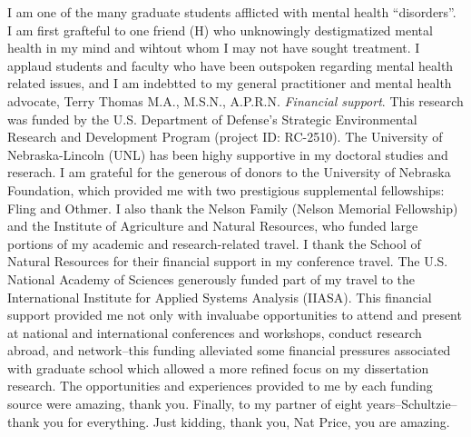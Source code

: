 \documentclass[12pt,twoside,openany]{reedthesis}
\begin{document}
I am one of the many graduate students afflicted with mental health ``disorders''. I am first grafteful to one friend (H) who unknowingly destigmatized mental health in my mind and wihtout whom I may not have sought treatment. I applaud students and faculty who have been outspoken regarding mental health related issues, and I am indebtted to my general practitioner and mental health advocate, Terry Thomas M.A., M.S.N., A.P.R.N.
\emph{Financial support}. This research was funded by the U.S. Department of Defense's Strategic Environmental Research and Development Program (project ID: RC-2510). The University of Nebraska-Lincoln (UNL) has been highy supportive in my doctoral studies and reserach. I am grateful for the generous of donors to the University of Nebraska Foundation, which provided me with two prestigious supplemental fellowships: Fling and Othmer. I also thank the Nelson Family (Nelson Memorial Fellowship) and the Institute of Agriculture and Natural Resources, who funded large portions of my academic and research-related travel. I thank the School of Natural Resources for their financial support in my conference travel. The U.S. National Academy of Sciences generously funded part of my travel to the International Institute for Applied Systems Analysis (IIASA). This financial support provided me not only with invaluabe opportunities to attend and present at national and international conferences and workshops, conduct research abroad, and network--this funding alleviated some financial pressures associated with graduate school which allowed a more refined focus on my dissertation research. The opportunities and experiences provided to me by each funding source were amazing, thank you.
Finally, to my partner of eight years--Schultzie--thank you for everything. Just kidding, thank you, Nat Price, you are amazing.
%

  \hypersetup{linkcolor=black}
  \setcounter{tocdepth}{2}
  \tableofcontents

  \listoftables

  \listoffigures


%
\mainmatter %
\pagestyle{fancyplain} %
\doublespacing{} %
\end{document}
